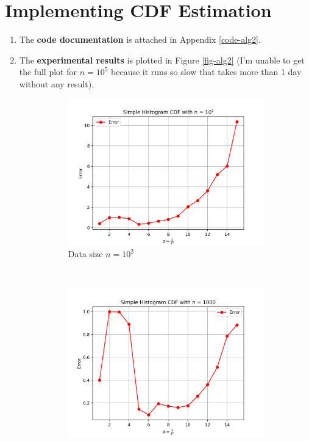 \documentclass[11pt]{article}
\begin{document}
\section{Implementing CDF Estimation}
\begin{enumerate}
	\item 
	The \textbf{code documentation} is attached in Appendix \ref{code-alg2}.
	\item
	The \textbf{experimental results} is plotted in Figure \ref{fig-alg2} (I'm unable to get the full plot for $n = 10^5$ because it runs so slow that takes more than 1 day without any result).
		\begin{figure}[t!]
		    \centering
		    \begin{subfigure}[t]{0.4\textwidth}
		        \centering
		        \includegraphics[width=\textwidth]{alg2-1}
		        \caption{Data size $n = 10^2$}
		    \end{subfigure}%
		    ~ 
		    \begin{subfigure}[t]{0.4\textwidth}
		        \centering
		        \includegraphics[width=\textwidth]{alg2-2}

\end{subfigure}
\end{figure}
\end{enumerate}
\end{document}
